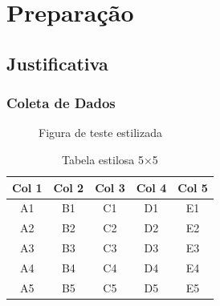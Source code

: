 \documentclass{Arquivos/abntexUFT}
\begin{document}
\pagestyle{meuestilo} 




\clearpage
{} 
\pagestyle{meuestilo}





\lipsum[1]



\part{Preparação}


\chapter{Justificativa}
\section{Coleta de Dados}
\lipsum[5]



\begin{figure}[h]
    \centering
    \caption{Figura de teste estilizada}
    \label{fig:teste-estilosa}
\end{figure}



\begin{table}[h]
    \centering
    \label{tab:estilosa}
    \begin{tabular}{ccccc}
        \toprule
        Col 1 & Col 2 & Col 3 & Col 4 & Col 5 \\
        \midrule
        A1 & B1 & C1 & D1 & E1 \\
        A2 & B2 & C2 & D2 & E2 \\
        A3 & B3 & C3 & D3 & E3 \\
        A4 & B4 & C4 & D4 & E4 \\
        A5 & B5 & C5 & D5 & E5 \\
        \bottomrule
    \end{tabular}
    \caption{Tabela estilosa 5×5}
\end{table}
\end{document}
